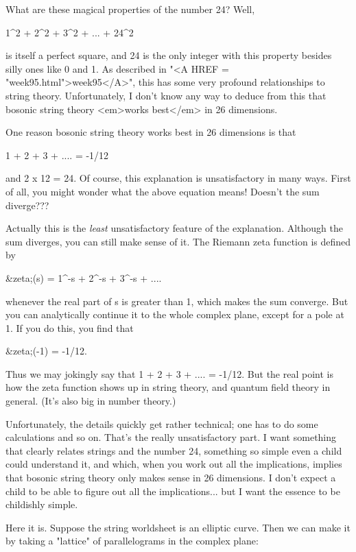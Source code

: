 What are these magical properties of the number 24?  Well,

                    1^{2} + 2^{2} + 3^{2} + ... + 24^{2}

is itself a perfect square, and 24 is the only integer with this
property besides silly ones like 0 and 1.  As described in "<A HREF = "week95.html">week95</A>", this
has some very profound relationships to string theory.  Unfortunately, I
don't know any way to deduce from this that bosonic string theory <em>works
best</em> in 26 dimensions.  

One reason bosonic string theory works best in 26 dimensions is that

                    1 + 2 + 3 + .... = -1/12

and 2 x 12 = 24.  Of course, this explanation is unsatisfactory in many 
ways.  First of all, you might wonder what the above equation means!   
Doesn't the sum diverge???

Actually this is the \emph{least} unsatisfactory feature of the explanation.
Although the sum diverges, you can still make sense of it.  The Riemann
zeta function is defined by

                &zeta;(s) = 1^{-s} + 2^{-s} + 3^{-s} + ....

whenever the real part of s is greater than 1, which makes the sum
converge. But you can analytically continue it to the whole complex
plane, except for a pole at 1.  If you do this, you find that 

                       &zeta;(-1) = -1/12.  

Thus we may jokingly say that 1 + 2 + 3 + .... = -1/12.  But the
real point is how the zeta function shows up in string theory, and
quantum field theory in general.  (It's also big in number theory.)

Unfortunately, the details quickly get rather technical; one has to do
some calculations and so on.  That's the really unsatisfactory part. I
want something that clearly relates strings and the number 24, something
so simple even a child could understand it, and which, when you work out
all the implications, implies that bosonic string theory only makes
sense in 26 dimensions.   I don't expect a child to be able to figure
out all the implications... but I want the essence to be childishly
simple.

Here it is.  Suppose the string worldsheet is an elliptic curve.  Then we
can make it by taking a "lattice" of parallelograms in the complex plane:
                 

